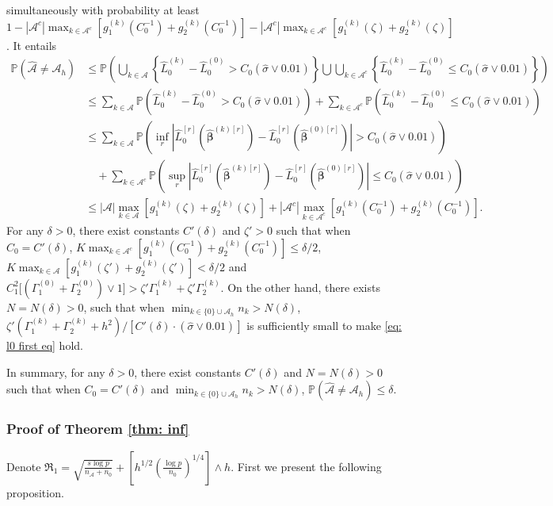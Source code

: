 \documentclass[12pt]{article}
\newcommand{\tp}{\mathbb{P}}
\newcommand{\norm}[1]{|#1|}
\newcommand{\bbeta}{\bm{\beta}}
\newcommand{\hbeta}{\hat{\bm{\beta}}}
\newcommand{\ma}{\mathcal{A}}
\newcommand{\mah}{\mathcal{A}_h}
\newcommand{\mac}{\mathcal{A}^c}
\newcommand{\na}{n_{\mathcal{A}}}
\newcommand{\transet}{\{0\}\cup \mah}
\newcommand{\<}{\langle}
\renewcommand{\>}{\rangle}
\begin{document}
simultaneously with probability at least $1-|\mac|\max_{k \in \mac}[g_1^{(k)}(C_0^{-1}) + g_2^{(k)}(C_0^{-1})]-|\mac|\max_{k \in \mac}\allowbreak[g_1^{(k)}(\zeta) + g_2^{(k)}(\zeta)]$. It entails
\begin{align}
	\tp(\widehat{\mathcal{A}} \neq \mathcal{A}_h) & \leq \tp\left(\bigcup_{k \in \ma}\left\{\hat{L}_0^{(k)} - \hat{L}_0^{(0)} > C_0(\hat{\sigma} \vee 0.01) \right\}\bigcup \bigcup_{k \in \mac}\left\{\hat{L}_0^{(k)} - \hat{L}_0^{(0)} \leq C_0(\hat{\sigma} \vee 0.01) \right\}\right) \\
	&\leq \sum_{k \in \ma}\tp\left(\hat{L}_0^{(k)} - \hat{L}_0^{(0)} > C_0(\hat{\sigma} \vee 0.01)\right) + \sum_{k \in \mac}\tp\left(\hat{L}_0^{(k)} - \hat{L}_0^{(0)} \leq C_0(\hat{\sigma} \vee 0.01) \right) \\
	&\leq \sum_{k \in \ma}\tp\left(\inf_r\norm{\hat{L}_0^{[r]}(\hat{\bbeta}^{(k)[r]}) - \hat{L}_0^{[r]}(\hbeta^{(0)[r]})} > C_0(\hat{\sigma} \vee 0.01)\right) \\
	&\quad + \sum_{k \in \mac}\tp\left(\sup_r\norm{\hat{L}_0^{[r]}(\hat{\bbeta}^{(k)[r]}) - \hat{L}_0^{[r]}(\hbeta^{(0)[r]})} \leq C_0(\hat{\sigma} \vee 0.01) \right) \\
	&\leq |\ma|\max_{k \in \ma}[g_1^{(k)}(\zeta) + g_2^{(k)}(\zeta)] +|\mac|\max_{k \in \mac}[g_1^{(k)}(C_0^{-1}) + g_2^{(k)}(C_0^{-1})].
\end{align}
For any $\delta > 0$, there exist constants $C'(\delta)$ and $\zeta' > 0$ such that when $C_0 = C'(\delta)$, $K\max_{k \in \mac}[g_1^{(k)}(C_0^{-1}) + g_2^{(k)}(C_0^{-1})] \leq \delta/2$, $K\max_{k \in \ma}[g_1^{(k)}(\zeta') + g_2^{(k)}(\zeta')] < \delta/2$ and $C_1^2\big[(\Gamma_1^{(0)} + \Gamma_2^{(0)}) \vee 1\big] > \zeta'\Gamma_1^{(k)} + \zeta'\Gamma_2^{(k)}$. On the other hand, there exists $N = N(\delta) > 0$, such that when $\min_{k \in \transet} n_k > N(\delta)$, $\zeta'\left(\Gamma_1^{(k)} + \Gamma_2^{(k)} + h^2\right)/[C'(\delta)\cdot(\hat{\sigma} \vee 0.01)]$ is sufficiently small to make \eqref{eq: l0 first eq} hold. 

In summary, for any $\delta > 0$, there exist constants $C'(\delta)$ and $N = N(\delta) > 0$ such that when $C_0 = C'(\delta)$ and $\min_{k \in \transet} n_k > N(\delta)$, $\tp(\widehat{\mathcal{A}} \neq \mathcal{A}_h) \leq \delta$.

\subsubsection{Proof of Theorem \ref{thm: inf}}
Denote $\Re_1 = \sqrt{\frac{s\log p}{\na+n_0}} +  \left[h^{1/2}\left(\frac{\log p}{n_0}\right)^{1/4}\right] \wedge h$. First we present the following proposition.
\end{document}
